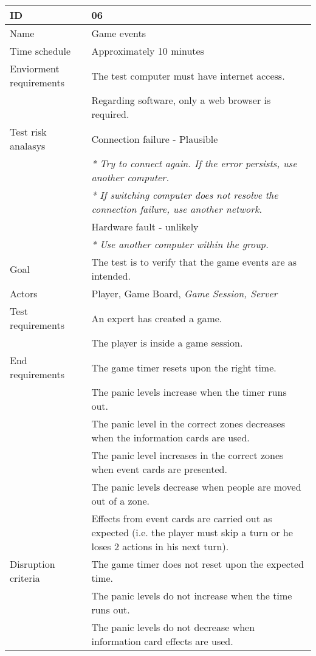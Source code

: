 {\footnotesize
\begin{table}[H]
\begin{tabular}{| p{5cm} | p{10cm} |}\hline
	\textbf{ID}	& \textbf{06} \\ \hline
	Name		& Game events\\ \hline
	Time schedule	& Approximately 10 minutes\\ \hline
	Enviorment requirements 
		& The test computer must have internet access. \\
		& Regarding software, only a web browser is required. \\ \hline
	Test risk analasys 
		& Connection failure - Plausible \\
		& \emph{* Try to connect again. If the error persists, use another computer.} \\
		& \emph{* If switching computer does not resolve the connection failure, use another network.}\\ 
		& Hardware fault - unlikely \\
		& \emph{* Use another computer within the group.} \\ \hline
	Goal	& The test is to verify that the game events are as intended. \\ \hline
	Actors	& Player, Game Board, \emph{Game Session, Server}\\ \hline
	Test requirements
		& An expert has created a game. \\
		& The player is inside a game session. \\ \hline
	End requirements 
		& The game timer resets upon the right time.\\
		& The panic levels increase when the timer runs out.\\
		& The panic level in the correct zones decreases when the information cards are used.\\
		& The panic level increases in the correct zones when event cards are presented.\\
		& The panic levels decrease when people are moved out of a zone.\\
		& Effects from event cards are carried out as expected (i.e. the player must 
			skip a turn or he loses 2 actions in his next turn). \\ \hline
	Disruption criteria 
		& The game timer does not reset upon the expected time.\\
		& The panic levels do not increase when the time runs out.\\
		& The panic levels do not decrease when information card effects are used.\\

\end{tabular}
\end{table}}

